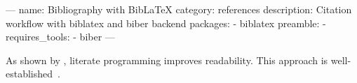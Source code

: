 ---
name: Bibliography with BibLaTeX
category: references
description: Citation workflow with biblatex and biber backend
packages:
  - biblatex
preamble:
  - 
requires_tools:
  - biber
---

As shown by \textcite{knuth1984}, literate programming improves readability.
This approach is well-established~\parencite{knuth1984}.

\printbibliography
